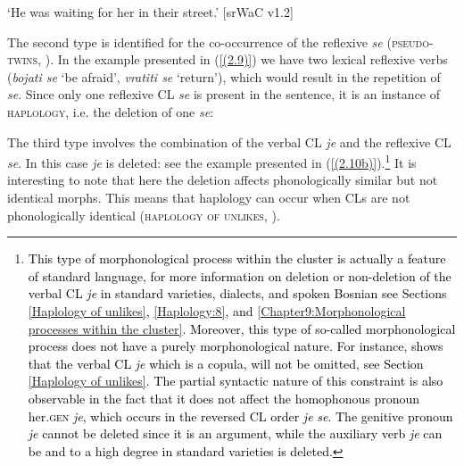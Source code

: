 \begin{exe}\ex
\begin{xlist}
\end{xlist}
\glt ‘He was waiting for her in their street.’
\hfill [srWaC v1.2]
\end{exe}

\noindent The second type is identified for the co-occurrence of the reflexive \textit{se} (\textsc{pseudo-twins}, \citealt[79]{Junghanns02}). In the example presented in (\ref{(2.9)}) we have two lexical reflexive verbs (\textit{bojati se} `be afraid', \textit{vratiti se} `return'), which would result in the repetition of \textit{se}. Since only one reflexive CL \textit{se} is present in the sentence, it is an instance of \textsc{haplology}, i.e. the deletion of one \textit{se}:


The third type involves the combination of the verbal CL \textit{je} and the reflexive CL \textit{se}. In this case \textit{je} is deleted: see the example presented in (\ref{(2.10b)}).\footnote{\textcolor{black}{This type of morphonological process within the cluster is actually a feature of standard language, for more information on deletion or non-deletion of the verbal CL \textit{je} in standard varieties, dialects, and spoken Bosnian see Sections \ref{Haplology of unlikes}, \ref{Haplology:8}, and \ref{Chapter9:Morphonological processes within the cluster}. Moreover, this type of so-called morphonological process does not have a purely morphonological nature. For instance, \citet[564]{Ridjanovic12} shows that the verbal CL \textit{je} which is a copula, will not be omitted, see Section \ref{Haplology of unlikes}. The partial syntactic nature of this constraint is also observable in the fact that it does not affect the homophonous pronoun her.\textsc{gen} \textit{je}, which occurs in the reversed CL order \textit{je} \textit{se}. The genitive pronoun \textit{je} cannot be deleted since it is an argument, while the auxiliary verb \textit{je} can be and to a high degree in standard varieties is deleted.}} It is interesting to note that here the deletion affects phonologically similar but not identical morphs. This means that haplology can occur when CLs are not phonologically identical (\textsc{haplology} \textsc{of} \textsc{unlikes}, \citealt{RosenHana17}). 

